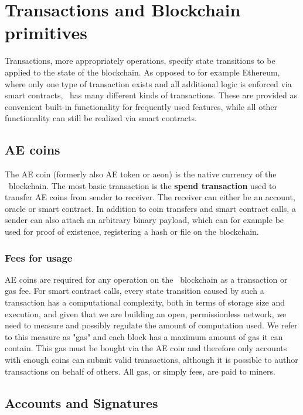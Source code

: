 \section{Transactions and Blockchain primitives}
\label{sect:transactions}

Transactions, more appropriately operations, specify state transitions to
be applied to the state of the blockchain. As opposed to for example Ethereum,
where only one type of transaction exists and all additional logic is enforced
via smart contracts, \aet\ has many different kinds of transactions.
These are provided as convenient built-in functionality for frequently used
features, while all other functionality can still be realized via smart
contracts.



\subsection{AE coins}
\label{sect:aespend}

The AE coin (formerly also AE token or aeon) is the native currency of the \aet\ blockchain. The most basic transaction is the \textbf{spend transaction} used to
transfer AE coins from sender to receiver. The receiver can either be an account,
oracle or smart contract. 
In addition to coin transfers and smart contract calls, a sender can also attach an arbitrary binary
payload, which can for example be used for proof of existence, registering a
hash or file on the blockchain.

\subsubsection{Fees for usage}
AE coins are required for any operation on the \aet\ blockchain as a transaction or gas fee. For smart contract calls, every state transition caused by such a transaction has a computational
complexity, both in terms of storage size and execution, and given that we are
building an open, permissionless network, we need to measure and possibly
regulate the amount of computation used. We refer to this measure as "gas" and
each block has a maximum amount of gas it can contain.
This gas must be bought via the AE coin and therefore only
accounts with enough coins can submit valid transactions, although it is
possible to author transactions on behalf of others. All gas, or simply fees,
are paid to miners.


\subsection{Accounts and Signatures}
\label{sect:ga}

